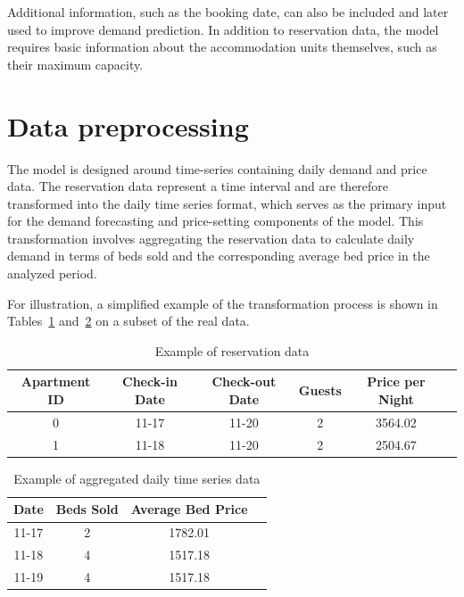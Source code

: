 Additional information, such as the booking date, can also be included and later used to improve demand prediction. In addition to reservation data, the model requires basic information about the accommodation units themselves, such as their maximum capacity.

\section{Data preprocessing}
The model is designed around time-series containing daily demand and price data. The reservation data represent a time interval and are therefore transformed into the daily time series format, which serves as the primary input for the demand forecasting and price-setting components of the model. This transformation involves aggregating the reservation data to calculate daily demand in terms of beds sold and the corresponding average bed price in the analyzed period.

For illustration, a simplified example of the transformation process is shown in Tables~\ref{tab:reservation_example} and~\ref{tab:daily_time_series_example} on a subset of the real data.

\begin{table}[ht]
    \centering
    \begin{tabular}{|c|c|c|c|c|c|}
        \hline
        Apartment ID & Check-in Date & Check-out Date & Guests & Price per Night \\
        \hline
        0            & 11-17         & 11-20          & 2      & 3564.02         \\
        1            & 11-18         & 11-20          & 2      & 2504.67         \\
        \hline
    \end{tabular}
    \caption{Example of reservation data}
    \label{tab:reservation_example}
\end{table}

\begin{table}[ht]
    \centering
    \begin{tabular}{|c|c|c|c|}
        \hline
        Date  & Beds Sold & Average Bed Price \\
        \hline
        11-17 & 2         & 1782.01           \\
        11-18 & 4         & 1517.18           \\
        11-19 & 4         & 1517.18           \\
        \hline
    \end{tabular}
    \caption{Example of aggregated daily time series data}
    \label{tab:daily_time_series_example}
\end{table}

